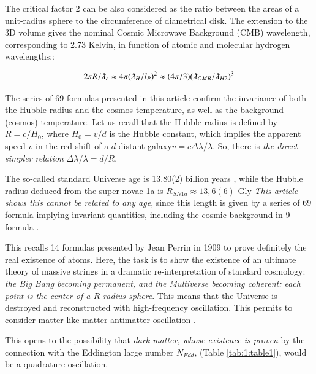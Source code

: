 \documentclass[a4paper,9pt]{article}
\begin{document}
    
    The critical factor 2 can be also considered as the ratio between the areas of a unit-radius sphere to the circumference of diametrical disk. The extension to the 3D volume gives the nominal Cosmic Microwave Background (CMB) wavelength, corresponding to 2.73 Kelvin, in function of atomic and molecular hydrogen wavelengths:\cite{Sanchez}:
    
    \begin{equation}
        2\pi R/\lambdabar_e \approx 4\pi (\lambdabar_H/l_P)^2 \approx (4\pi/3) (\lambdabar_{CMB}/\lambdabar_{H2})^3
    \end{equation}

    The series of 69 formulas presented in this article confirm the invariance of both the Hubble radius and the cosmos temperature, as well as the background (cosmos) temperature. Let us recall that the Hubble radius is defined by $R = c/H_0$, where $H_0 = v/d$ is the Hubble constant, which implies the apparent speed $v$ in the red-shift of a $d$-distant galaxy$ v = c \Delta \lambda/\lambda$. So, there is \textit {the direct simpler relation} $\Delta \lambda/\lambda =  d/R$. 
    

    
    The so-called standard Universe age is 13.80(2) billion years \cite{Tanabashi}, while the Hubble radius deduced from the super novae 1a is $R_{SN1a} \approx 13,6(6)$ Gly \cite{Freeman}\textit{This article shows this cannot be related to any age}, since this length is given by a series of 69 formula implying invariant quantities, including the cosmic background in 9 formula . 
    
    
    This recalls 14 formulas presented by Jean Perrin in 1909 to prove definitely the real existence of atoms. Here, the task is to show the existence of an ultimate theory of massive strings in a dramatic re-interpretation of standard cosmology:\textit{ the Big Bang becoming permanent, and the Multiverse becoming coherent: each point is the center of a $R$-radius sphere}. This means that the Universe is destroyed and reconstructed with high-frequency oscillation. This permits to consider matter like matter-antimatter oscillation \cite{Sanchez2}. 
    
    This opens to the possibility that \textit {dark matter, whose existence is proven} by the connection with the Eddington large number $N_{Edd}$, (Table \ref{tab:1:table1}), would be a quadrature oscillation.
\end{document}
